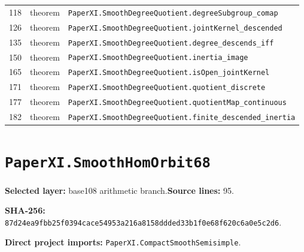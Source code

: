 \documentclass[10pt,oneside]{book}
\begin{document}
\begin{longtable}{@{}p{}p{}p{}@{}}
118&theorem&\nolinkurl{PaperXI.SmoothDegreeQuotient.degreeSubgroup_comap}\\

126&theorem&\nolinkurl{PaperXI.SmoothDegreeQuotient.jointKernel_descended}\\

135&theorem&\nolinkurl{PaperXI.SmoothDegreeQuotient.degree_descends_iff}\\

150&theorem&\nolinkurl{PaperXI.SmoothDegreeQuotient.inertia_image}\\

165&theorem&\nolinkurl{PaperXI.SmoothDegreeQuotient.isOpen_jointKernel}\\

171&theorem&\nolinkurl{PaperXI.SmoothDegreeQuotient.quotient_discrete}\\

177&theorem&\nolinkurl{PaperXI.SmoothDegreeQuotient.quotientMap_continuous}\\

182&theorem&\nolinkurl{PaperXI.SmoothDegreeQuotient.finite_descended_inertia}\\

\bottomrule\end{longtable}

\section{\texorpdfstring{\nolinkurl{PaperXI.SmoothHomOrbit68}}{PaperXI.SmoothHomOrbit68}}\label{module:PaperXI.SmoothHomOrbit68}

\textbf{Selected layer:} base108 arithmetic branch.\quad\textbf{Source lines:} 95.\par\textbf{SHA-256:} {\scriptsize\nolinkurl{87d24ea9fbb25f0394cace54953a216a8158ddded33b1f0e68f620c6a0e5c2d6}}.


\textbf{Direct project imports:} \nolinkurl{PaperXI.CompactSmoothSemisimple}.
\end{document}
